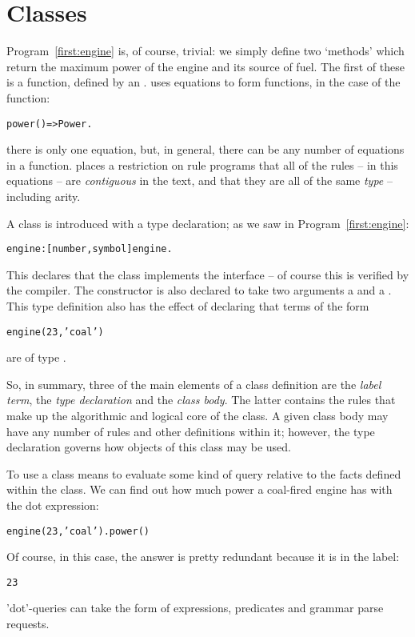 \section{Classes}
Program~\vref{first:engine} is, of course, trivial: we simply define two `methods' which return the maximum power of the engine and its source of fuel. The first of these is a function, defined by an . \go uses equations to form functions, in the case of the  function:
\begin{alltt}
power()=>Power.
\end{alltt}
there is only one equation, but, in general, there can be any number of equations in a function. \go places a restriction on rule programs that all of the rules -- in this equations -- are \emph{contiguous} in the text, and that they are all of the same \emph{type} -- including arity.

A class is introduced with a type declaration; as we saw in Program~\ref{first:engine}:
\begin{alltt}
engine:[number,symbol]\conarrow{}engine.
\end{alltt}
This declares that the  class implements the  interface -- of course this is verified by the compiler. The  constructor is also declared to take two arguments a  and a . This type definition also has the effect of declaring that terms of the form
\begin{alltt}
engine(23,'coal')
\end{alltt}
are of type .

So, in summary, three of the main elements of a class definition are the \emph{label term}, the \emph{type declaration} and the \emph{class body}. The latter contains the rules that make up the algorithmic and logical core of the class. A given class body may have any number of rules and other definitions within it; however, the type declaration governs how objects of this class may be used. 

To use a class means to evaluate some kind of query relative to the facts defined within the class. We can find out how much power a coal-fired engine has with the dot expression:
\begin{alltt}
engine(23,'coal').power()
\end{alltt}
Of course, in this case, the answer is pretty redundant because it is in the label:
\begin{alltt}
23
\end{alltt}
'dot'-queries can take the form of expressions, predicates and grammar parse requests.

